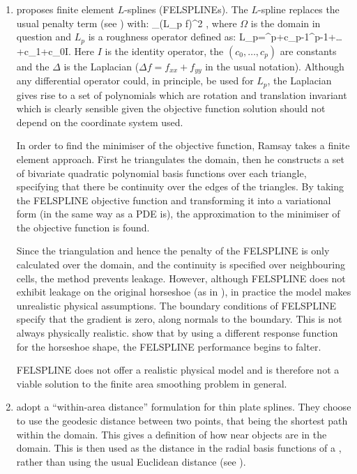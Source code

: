 \begin{enumerate}
\item {} proposes finite element $L$-splines (FELSPLINEs). The $L$-spline replaces the usual penalty term (see ) with:
\be
\int_\Omega (L_p f)^2 \Omega,
\ee
where $\Omega$ is the domain in question and $L_p$ is a roughness operator defined as:
\be
L_p=\Delta^p+c_{p-1}\Delta^{p-1}+\dots+c_1\Delta+c_0I.
\ee
Here $I$ is the identity operator, the $(c_0,\dots, c_p)$ are constants and the $\Delta$ is the Laplacian ($\Delta f = f_{xx}+f_{yy}$ in the usual notation). Although any differential operator could, in principle, be used for $L_p$, the Laplacian gives rise to a set of polynomials which are rotation and translation invariant which is clearly sensible given the objective function solution should not depend on the coordinate system used.

In order to find the minimiser of the objective function, Ramsay takes a finite element approach. First he triangulates the domain, then he constructs a set of bivariate quadratic polynomial basis functions over each triangle, specifying that there be continuity over the edges of the triangles. By taking the FELSPLINE objective function and transforming it into a variational form (in the same way as a PDE is), the approximation to the minimiser of the objective function is found. 

Since the triangulation and hence the penalty of the FELSPLINE is only calculated over the domain, and the continuity is specified over neighbouring cells, the method prevents leakage. However, although FELSPLINE does not exhibit leakage on the original horseshoe (as in ), in practice the model makes unrealistic physical assumptions. The boundary conditions of FELSPLINE specify that the gradient is zero, along normals to the boundary. This is not always physically realistic.  show that by using a different response function for the horseshoe shape, the FELSPLINE performance begins to falter.

FELSPLINE does not offer a realistic physical model and is therefore not a viable solution to the finite area smoothing problem in general.

\item {} adopt a ``within-area distance'' formulation for thin plate splines. They choose to use the geodesic distance between two points, that being the shortest path within the domain. This gives a definition of how near objects are in the domain. This is then used as the distance in the radial basis functions of a \tprs, rather than using the usual Euclidean distance (see ).


\end{enumerate}
